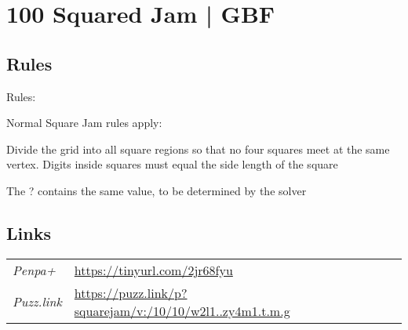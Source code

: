 \section[100 Squared Jam | GBF {[\emph{Square Jam}]}]{100 Squared Jam | {\normalfont GBF}}
\label{sec:00-100-squared-jam-gbf}

\subsection*{Rules}
\begin{markdown}
Rules:

Normal Square Jam rules apply:

Divide the grid into all square regions so that no four squares meet at the same vertex. Digits inside squares must equal the side length of the square



The ? contains the same value, to be determined by the solver
\end{markdown}
\subsection*{Links}
\begin{tabularx}{\textwidth}{l X}
\emph{Penpa+} & \url{https://tinyurl.com/2jr68fyu} \\
\emph{Puzz.link} & \url{https://puzz.link/p?squarejam/v:/10/10/w2l1..zy4m1.t.m.g} \\
\end{tabularx}
\pagebreak
